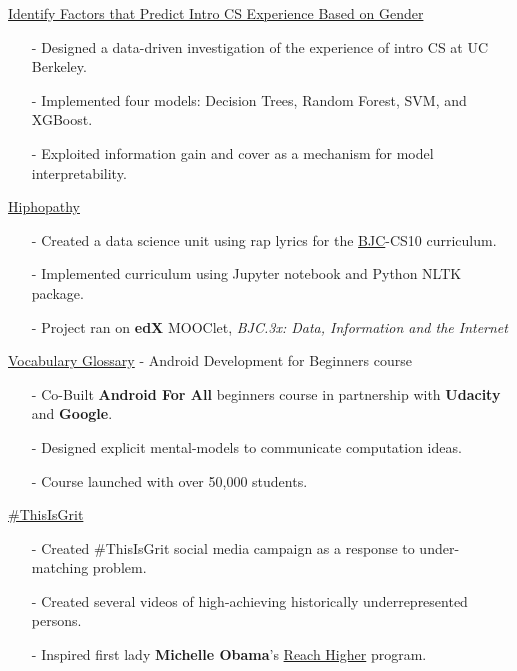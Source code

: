 \documentclass[11pt,article,oneside]{memoir}
\begin{document}
\ind \href{https://github.com/omoju/IntroCSExperiencePrediction}{Identify Factors that Predict Intro CS Experience Based on Gender}
\begin{itemize}[noitemsep,nolistsep]
\item[-] Designed a data-driven investigation of the experience of intro CS at UC Berkeley.
\item[-] Implemented four models: Decision Trees, Random Forest, SVM, and XGBoost.
\item[-] Exploited information gain and cover as a mechanism for model interpretability.
\end{itemize}

\ind \href{https://github.com/omoju/hiphopathy}{Hiphopathy}
\begin{itemize}[noitemsep,nolistsep]
\item[-] Created a data science unit using rap lyrics for the \href{http://bjc.berkeley.edu/}{BJC}-CS10 curriculum. 
\item[-] Implemented curriculum using Jupyter notebook and Python NLTK package.
\item[-] Project ran on \textbf{edX} MOOClet, \textit{BJC.3x: Data, Information and the Internet}
\end{itemize}

\ind \href{https://developers.google.com/android/for-all/vocab-words/}{Vocabulary Glossary} - Android Development for Beginners course
\begin{itemize}[noitemsep,nolistsep]
\item[-] Co-Built \textbf{Android For All} beginners course in partnership with \textbf{Udacity} and \textbf{Google}. 
\item[-] Designed explicit mental-models to communicate computation ideas.
\item[-] Course launched with over 50,000 students.
\end{itemize}

\ind \href{https://www.youtube.com/channel/UCZK66JujoN3KY3sak2kEa2w?&ab_channel=ThisIsGRIT}{\#ThisIsGrit}
\begin{itemize}[noitemsep,nolistsep]
\item[-] Created \#ThisIsGrit social media campaign as a response to under-matching problem.
\item[-] Created several videos of high-achieving historically underrepresented persons.
\item[-] Inspired first lady \textbf{Michelle Obama}'s \href{https://obamawhitehouse.archives.gov/reach-higher}{Reach Higher} program.
\end{itemize}
\end{document}
